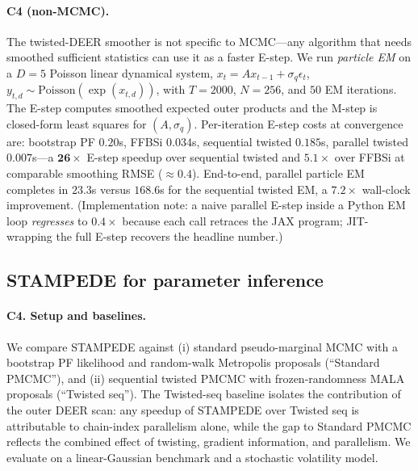 \documentclass{article}
\begin{document}
\paragraph{C4 (non-MCMC).} The twisted-DEER smoother is not specific to MCMC---any algorithm that needs smoothed sufficient statistics can use it as a faster E-step. We run \emph{particle EM} on a $D=5$ Poisson linear dynamical system, $x_t = A x_{t-1} + \sigma_q \epsilon_t$, $y_{t,d} \sim \text{Poisson}(\exp(x_{t,d}))$, with $T=2000$, $N=256$, and $50$ EM iterations. The E-step computes smoothed expected outer products and the M-step is closed-form least squares for $(A, \sigma_q)$. Per-iteration E-step costs at convergence are: bootstrap PF $0.20$s, FFBSi $0.034$s, sequential twisted $0.185$s, parallel twisted $\mathbf{0.007}$s---a $\mathbf{26\times}$ E-step speedup over sequential twisted and $5.1\times$ over FFBSi at comparable smoothing RMSE ($\approx 0.4$). End-to-end, parallel particle EM completes in $\mathbf{23.3}$s versus $168.6$s for the sequential twisted EM, a $\mathbf{7.2\times}$ wall-clock improvement. (Implementation note: a naive parallel E-step inside a Python EM loop \emph{regresses} to $0.4\times$ because each call retraces the JAX program; JIT-wrapping the full E-step recovers the headline number.)

\subsection{STAMPEDE for parameter inference}
\label{sec:exp-mcmc}

\paragraph{C4. Setup and baselines.} We compare STAMPEDE against (i) standard pseudo-marginal MCMC with a bootstrap PF likelihood and random-walk Metropolis proposals (``Standard PMCMC''), and (ii) sequential twisted PMCMC with frozen-randomness MALA proposals (``Twisted seq''). The Twisted-seq baseline isolates the contribution of the outer DEER scan: any speedup of STAMPEDE over Twisted seq is attributable to chain-index parallelism alone, while the gap to Standard PMCMC reflects the combined effect of twisting, gradient information, and parallelism. We evaluate on a linear-Gaussian benchmark and a stochastic volatility model.
\end{document}

